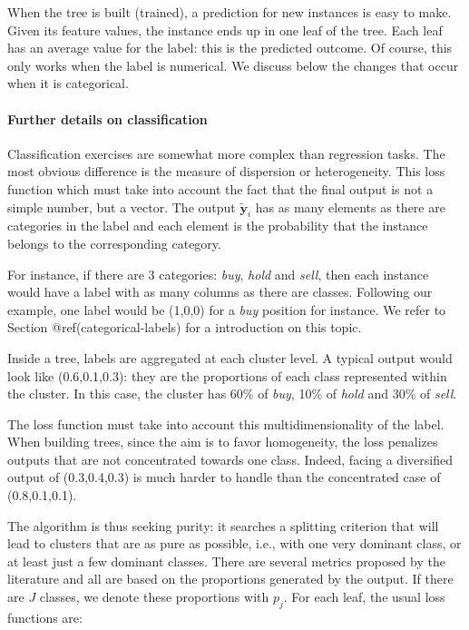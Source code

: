 When the tree is built (trained), a prediction for new instances is easy to make. Given its feature values, the instance ends up in one leaf of the tree. Each leaf has an average value for the label: this is the predicted outcome. Of course, this only works when the label is numerical. We discuss below the changes that occur when it is categorical.

\paragraph{Further details on classification}\label{sec_treeclass}

Classification exercises are somewhat more complex than regression tasks. The most obvious difference is the measure of dispersion or heterogeneity. This loss function which must take into account the fact that the final output is not a simple number, but a vector. The output $\tilde{\textbf{y}}_i$ has as many elements as there are categories in the label and each element is the probability that the instance belongs to the corresponding category.

For instance, if there are 3 categories: \textit{buy}, \textit{hold} and \textit{sell}, then each instance would have a label with as many columns as there are classes. Following our example, one label would be (1,0,0) for a \textit{buy} position for instance. We refer to Section @ref(categorical-labels) for a introduction on this topic.

Inside a tree, labels are aggregated at each cluster level. A typical output would look like (0.6,0.1,0.3): they are the proportions of each class represented within the cluster. In this case, the cluster has 60\% of \textit{buy}, 10\% of \textit{hold} and 30\% of \textit{sell}.

The loss function must take into account this multidimensionality of the label. When building trees, since the aim is to favor homogeneity, the loss penalizes outputs that are not concentrated towards one class. Indeed, facing a diversified output of (0.3,0.4,0.3) is much harder to handle than the concentrated case of (0.8,0.1,0.1).

The algorithm is thus seeking purity: it searches a splitting criterion that will lead to clusters that are as pure as possible, i.e., with one very dominant class, or at least just a few dominant classes. There are several metrics proposed by the literature and all are based on the proportions generated by the output. If there are $J$ classes, we denote these proportions with $p_j$. For each leaf, the usual loss functions are:

